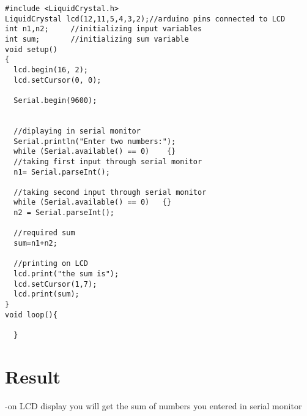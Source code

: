 \documentclass[twocolumn,13pt]{article}
\begin{document}
 
\begin{verbatim}
#include <LiquidCrystal.h>
LiquidCrystal lcd(12,11,5,4,3,2);//arduino pins connected to LCD
int n1,n2;     //initializing input variables
int sum;       //initializing sum variable
void setup()
{
  lcd.begin(16, 2);
  lcd.setCursor(0, 0);
  
  Serial.begin(9600);

  
  //diplaying in serial monitor
  Serial.println("Enter two numbers:");  
  while (Serial.available() == 0)    {}
  //taking first input through serial monitor
  n1= Serial.parseInt();                 
 
  //taking second input through serial monitor
  while (Serial.available() == 0)   {}  
  n2 = Serial.parseInt();

  //required sum
  sum=n1+n2;

  //printing on LCD
  lcd.print("the sum is");
  lcd.setCursor(1,7);
  lcd.print(sum);                     
}
void loop(){
    
  }
 \end{verbatim}


\section*{Result}
-on LCD display you will get the sum of numbers you entered in serial monitor
\end{document}
